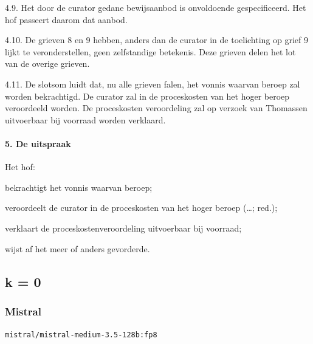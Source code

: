 \documentclass[
  dutch,
  a4paper,
]{article}
\begin{document}
4.9. Het door de curator gedane bewijsaanbod is onvoldoende gespecificeerd. Het hof passeert daarom dat aanbod.

4.10. De grieven 8 en 9 hebben, anders dan de curator in de toelichting op grief 9 lijkt te veronderstellen, geen zelfstandige betekenis. Deze grieven delen het lot van de overige grieven.

4.11. De slotsom luidt dat, nu alle grieven falen, het vonnis waarvan beroep zal worden bekrachtigd. De curator zal in de proceskosten van het hoger beroep veroordeeld worden. De proceskosten veroordeling zal op verzoek van Thomassen uitvoerbaar bij voorraad worden verklaard.

\paragraph{5. De uitspraak}\label{de-uitspraak-1}

Het hof:

bekrachtigt het vonnis waarvan beroep;

veroordeelt de curator in de proceskosten van het hoger beroep (\ldots; red.);

verklaart de proceskostenveroordeling uitvoerbaar bij voorraad;

wijst af het meer of anders gevorderde.

\newpage


\subsection{k = 0}\label{k-0-8}

\subsubsection{Mistral}\label{mistral-24}

\texttt{mistral/mistral-medium-3.5-128b:fp8}
\end{document}
